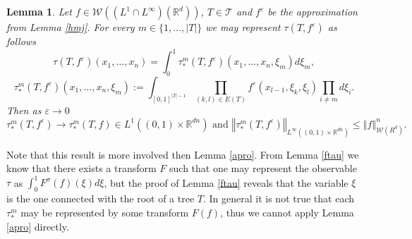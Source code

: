 \documentclass[10pt]{article}
\newtheorem{lemma}{Lemma}
\newcommand{\m}[1]{\mbox{#1}}
\newcommand*{\norm}[1]{\left\Vert{#1}\right\Vert}
\newcommand{\ve}{\varepsilon}
\newcommand{\R}{\mathbb{R}}
\newcommand{\izj}{\int_{0}^{1}}
\newcommand{\Tree}{\mathcal{T}}
\newcommand{\W}{\mathcal{W}}
\begin{document}
\begin{lemma}\label{taustar}
Let $f \in \W((L^{1}\cap L^{\infty})(\R^d))$, $T \in \Tree$ and $f^\ve$ be the approximation from Lemma \ref{hmj}. For every $m \in \{1,\dots,|T|\}$ we may represent $\tau(T,f^{\ve})$ as follows
\[
\tau(T,f^{\ve})(x_1,\dots,x_n) = \izj \tau_{*}^m(T,f^{\ve})(x_1,\dots,x_n,\xi_m)d\xi_m,
\]
\[
\tau_{*}^m(T,f^{\ve})(x_1,\dots,x_n,\xi_m):=\int_{[0,1]^{|T|-1}}\prod_{(k,l)\in E(T)}f^{\ve}(x_{l-1},\xi_k,\xi_l) \prod_{i\neq m} d\xi_i.
\]
Then as $\ve \rightarrow 0$
\[
\tau^m_{*}(T,f^{\ve}) \rightarrow \tau_{*}^m(T,f) \in L^{1}((0,1)\times \R^{dn}) \m{ and } \norm{\tau^m_{*}(T,f^\ve)}_{L^{\infty}((0,1)\times \R^{dn})} \leq \norm{f}_{\W(R^d)}^n. 
\]
\end{lemma}
Note that this result is more involved then Lemma \ref{apro}. From Lemma \ref{ftau} we know that there exists a transform $F$ such that one may represent the observable $\tau$ as $\izj F^\sigma(f)(\xi)d\xi$, but the proof of Lemma \ref{ftau} reveals that the variable $\xi$ is the one connected with the root of a tree $T$. In general it is not true that each $\tau_*^m$ may be represented by some transform $F(f)$, thus we cannot apply Lemma \ref{apro} directly. 
\end{document}
